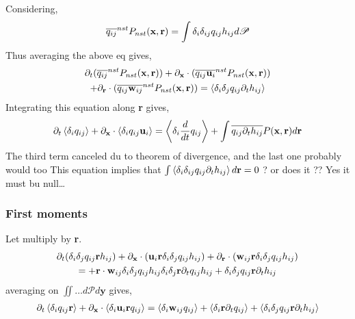 Considering,
\begin{equation*}
    \overline{q_{ij}}^{nst} P_{nst}(\textbf{x},\textbf{r})= \int\delta_i\delta_{ij} q_{ij} h_{ij} d\mathscr{P} 
\end{equation*}
Thus averaging the above eq gives, 
\begin{multline*}
    \partial_t (\overline{q_{ij}}^{nst} P_{nst}(\textbf{x},\textbf{r})) 
    + \partial_\textbf{x} \cdot ( \overline{q_{ij}\textbf{u}_i}^{nst} P_{nst}(\textbf{x},\textbf{r}))\\
    + \partial_\textbf{r} \cdot ( \overline{q_{ij}\textbf{w}_{ij}}^{nst} P_{nst}(\textbf{x},\textbf{r})) 
    = 
    \left<\delta_i\delta_{j}q_{ij}\partial_t h_{ij} \right>
\end{multline*}
Integrating this equation along \textbf{r} gives, 
\begin{equation}
    \partial_t \left<\delta_i q_{ij}\right> 
    + \partial_\textbf{x} \cdot  \left<\delta_i q_{ij}\textbf{u}_i\right>
    = 
    \left<\delta_i \frac{d}{d t} q_{ij}\right>
    + \int \overline{q_{ij}\partial_t h_{ij}}P(\textbf{x},\textbf{r})d\textbf{r}
\end{equation}
The third term canceled du to theorem of divergence, and the last one probably would too 
This equation implies that $ \int\left<\delta_i\delta_{ij}q_{ij}\partial_t h_{ij} \right>d\textbf{r} =0 $  ? or does it ??
Yes it must bu null\ldots




\subsubsection*{First moments}
Let multiply by \textbf{r}. 
\begin{multline*}
      \partial_t (\delta_i\delta_{j}q_{ij}\textbf{r}h_{ij}) 
    + \partial_\textbf{x} \cdot (\textbf{u}_i \textbf{r}\delta_i\delta_{j}q_{ij}h_{ij})
    + \partial_\textbf{r} \cdot (\textbf{w}_{ij} \textbf{r}\delta_i\delta_{j}q_{ij}h_{ij}) \\= 
    + \textbf{r} \cdot \textbf{w}_{ij} \delta_i\delta_{j}q_{ij}h_{ij}
    \delta_i\delta_{j}\textbf{r}\partial_t q_{ij}h_{ij} 
    + \delta_i\delta_{j}q_{ij}\textbf{r}\partial_t h_{ij} 
\end{multline*}
averaging on $\iint \ldots d\mathscr{P}d\textbf{y}$ gives, 
\begin{multline*}
      \partial_t \left<\delta_iq_{ij}\textbf{r}\right> 
    + \partial_\textbf{x} \cdot \left<\delta_i\textbf{u}_i \textbf{r}q_{ij}\right>
    = \left<\delta_i\textbf{w}_{ij}q_{ij}\right>
    + \left<\delta_i\textbf{r}\partial_t q_{ij}\right> 
    + \left<\delta_i\delta_{j}q_{ij}\textbf{r}\partial_t h_{ij} \right>
\end{multline*}


